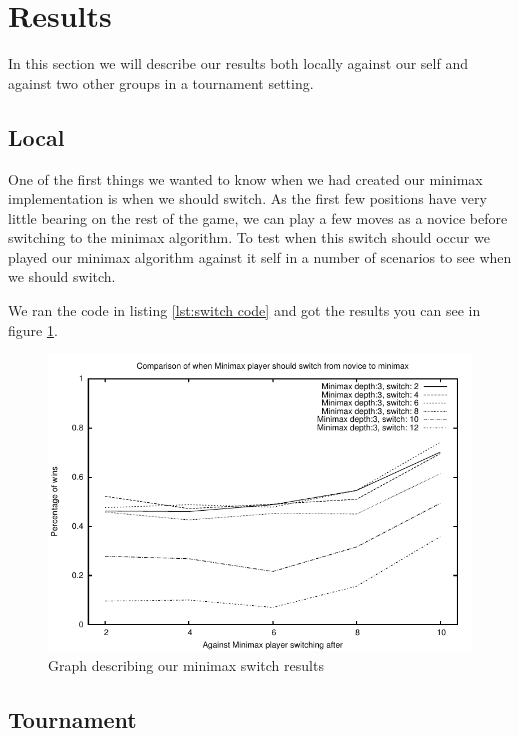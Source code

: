\section{Results}\label{results}
In this section we will describe our results both locally against our self and
against two other groups in a tournament setting.

\subsection{Local}\label{results:local}
One of the first things we wanted to know when we had created our minimax 
implementation is when we should switch. As the first few positions have very
little bearing on the rest of the game, we can play a few moves as a novice
before switching to the minimax algorithm. To test when this switch should
occur we played our minimax algorithm against it self in a number of scenarios
to see when we should switch. 

We ran the code in listing \ref{lst:switch code} and got the results you can see in figure
\ref{fig:minimax switch}.

\begin{figure}[htb]
	\includegraphics{graphs/switch.pdf}
	\caption[Minimax switch graph]{Graph describing our minimax switch results}
	\label{fig:minimax switch}
\end{figure}


\subsection{Tournament}\label{results:tournament}


